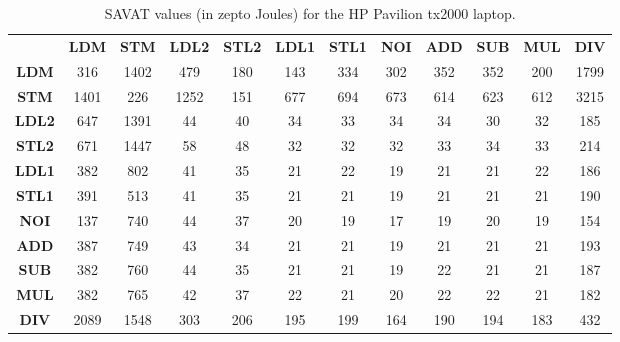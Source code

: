 \begin{table}[htb]
\scriptsize
\setlength{\tabcolsep}{2.3pt}
\setlength\extrarowheight{1pt}
\caption{SAVAT values (in zepto Joules) for the HP Pavilion tx2000 laptop.}
\begin{tabular}{|c||c|c|c|c|c|c|c|c|c|c|c|} \hline
& \textbf{LDM} & \textbf{STM} & \textbf{LDL2} & \textbf{STL2} & \textbf{LDL1} & \textbf{STL1} & \textbf{NOI} & \textbf{ADD} & \textbf{SUB} & \textbf{MUL} & \textbf{DIV}
\\ \hhline{|=||=|=|=|=|=|=|=|=|=|=|=|}
\textbf{LDM} &  {316} &  {1402} &  {479} &  {180} &  {143} &  {334} &  {302} &  {352} &  {352} &  {200} &  {1799} \\ \hline
\textbf{STM} &  {1401} &  {226} &  {1252} &  {151} &  {677} &  {694} &  {673} &  {614} &  {623} &  {612} &  {3215} \\ \hline
\textbf{LDL2} &  {647} &  {1391} &  {44} &  {40} &  {34} &  {33} &  {34} &  {34} &  {30} &  {32} &  {185} \\ \hline
\textbf{STL2} &  {671} &  {1447} &  {58} &  {48} &  {32} &  {32} &  {32} &  {33} &  {34} &  {33} &  {214} \\ \hline
\textbf{LDL1} &  {382} &  {802} &  {41} &  {35} &  {21} &  {22} &  {19} &  {21} &  {21} &  {22} &  {186} \\ \hline
\textbf{STL1} &  {391} &  {513} &  {41} &  {35} &  {21} &  {21} &  {19} &  {21} &  {21} &  {21} &  {190} \\ \hline
\textbf{NOI} &  {137} &  {740} &  {44} &  {37} &  {20} &  {19} &  {17} &  {19} &  {20} &  {19} &  {154} \\ \hline
\textbf{ADD} &  {387} &  {749} &  {43} &  {34} &  {21} &  {21} &  {19} &  {21} &  {21} &  {21} &  {193} \\ \hline
\textbf{SUB} &  {382} &  {760} &  {44} &  {35} &  {21} &  {21} &  {19} &  {22} &  {21} &  {21} &  {187} \\ \hline
\textbf{MUL} &  {382} &  {765} &  {42} &  {37} &  {22} &  {21} &  {20} &  {22} &  {22} &  {21} &  {182} \\ \hline
\textbf{DIV} &  {2089} &  {1548} &  {303} &  {206} &  {195} &  {199} &  {164} &  {190} &  {194} &  {183} &  {432} \\ \hline

\end{tabular}
\label{fig:savat-20cm-hpamd}
\end{table}
   
